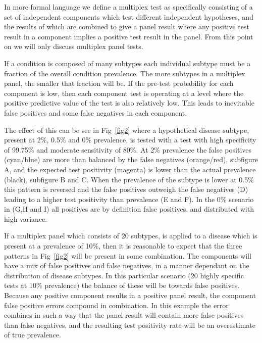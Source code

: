 \documentclass[10pt,letterpaper]{article}
\begin{document}
In more formal language we define a multiplex test as specifically consisting of a set of independent components which test different independent hypotheses, and the results of which are combined to give a panel result where any positive test result in a component implies a positive test result in the panel. From this point on we will only discuss multiplex panel tests.

If a condition is composed of many subtypes each individual subtype must be a fraction of the overall condition prevalence. The more subtypes in a multiplex panel, the smaller that fraction will be. If the pre-test probability for each component is low, then each component test is operating at a level where the positive predictive value of the test is also relatively low. This leads to inevitable false positives and some false negatives in each component.

The effect of this can be see in Fig~\ref{fig2} where a hypothetical disease subtype, present at 2\%, 0.5\% and 0\% prevalence, is tested with a test with high specificity of 99.75\% and moderate sensitivity of 80\%. At 2\% prevalence the false positives (cyan/blue) are more than balanced by the false negatives (orange/red), subfigure A, and the expected test positivity (magenta) is lower than the actual prevalence (black), subfigure B and C. When the prevalence of the subtype is lower at 0.5\% this pattern is reversed and the false positives outweigh the false negatives (D) leading to a higher test positivity than prevalence (E and F). In the 0\% scenario in (G,H and I) all positives are by definition false positives, and distributed with high variance.

If a multiplex panel which consists of 20 subtypes, is applied to a disease which is present at a prevalence of 10\%, then it is reasonable to expect that the three patterns in Fig~\ref{fig2} will be present in some combination. The components will have a mix of false positives and false negatives, in a manner dependant on the distribution of disease subtypes. In this particular scenario (20 highly specific tests at 10\% prevalence) the balance of these will be towards false positives. Because any positive component results in a positive panel result, the component false positive errors compound in combination. In this example the error combines in such a way that the panel result will contain more false positives than false negatives, and the resulting test positivity rate will be an overestimate of true prevalence.
\end{document}
